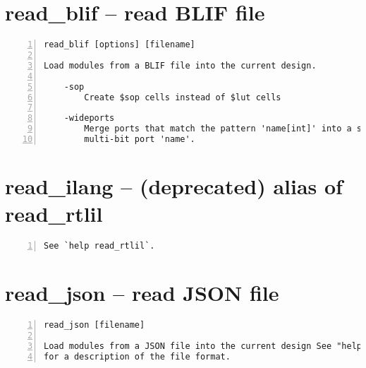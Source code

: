 \section{read\_blif -- read BLIF file}
\label{cmd:read_blif}
\begin{lstlisting}[numbers=left,frame=single]
    read_blif [options] [filename]

Load modules from a BLIF file into the current design.

    -sop
        Create $sop cells instead of $lut cells

    -wideports
        Merge ports that match the pattern 'name[int]' into a single
        multi-bit port 'name'.
\end{lstlisting}

\section{read\_ilang -- (deprecated) alias of read\_rtlil}
\label{cmd:read_ilang}
\begin{lstlisting}[numbers=left,frame=single]
See `help read_rtlil`.
\end{lstlisting}

\section{read\_json -- read JSON file}
\label{cmd:read_json}
\begin{lstlisting}[numbers=left,frame=single]
    read_json [filename]

Load modules from a JSON file into the current design See "help write_json"
for a description of the file format.
\end{lstlisting}

